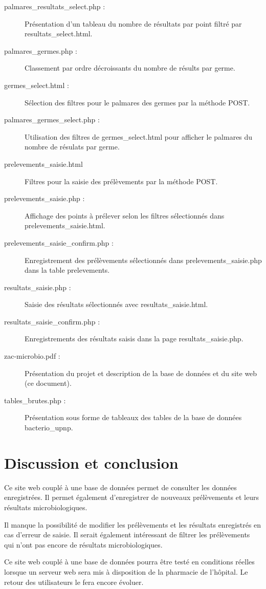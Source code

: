 \documentclass[12pt,a4paper,oneside]{article}
\begin{document}
\begin{description}
\item[palmares\_resultats\_select.php :] Présentation d'un tableau du nombre de résultats par point filtré par resultats\_select.html.
\item[palmares\_germes.php :] Classement par ordre décroissants du nombre de résults par germe.
\item[germes\_select.html :] Sélection des filtres pour le palmares des germes par la méthode POST.
\item[palmares\_germes\_select.php :] Utilisation des filtres de germes\_select.html pour afficher le palmares du nombre de résulats par germe.
\item[prelevements\_saisie.html] Filtres pour la saisie des prélèvements par la méthode POST.
\item[prelevements\_saisie.php :] Affichage des points à prélever selon les filtres sélectionnés dans prelevements\_saisie.html.
\item[prelevements\_saisie\_confirm.php :] Enregistrement des prélèvements sélectionnés dans prelevements\_saisie.php dans la table prelevements.
\item[resultats\_saisie.php :] Saisie des résultats sélectionnés avec resultats\_saisie.html.
\item[resultats\_saisie\_confirm.php :] Enregistrements des résultats saisis dans la page resultats\_saisie.php.
\item[zac-microbio.pdf :] Présentation du projet et description de la base de données et du site web (ce document).
\item[tables\_brutes.php :] Présentation sous forme de tableaux des tables de la base de données bacterio\_upnp.


\end{description}

\section{Discussion et conclusion}
Ce site web couplé à une base de données permet de consulter les données enregistrées. Il permet également d'enregistrer de nouveaux prélèvements et leurs résultats microbiologiques.

Il manque la possibilité de modifier les prélèvements et les résultats enregistrés en cas d'erreur de saisie. Il serait également intéressant de filtrer les prélèvements qui n'ont pas encore de résultats microbiologiques.

Ce site web couplé à une base de données pourra être testé en conditions réelles lorsque un serveur web sera mis à disposition de la pharmacie de l'hôpital. Le retour des utilisateurs le fera encore évoluer.
\end{document}
